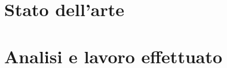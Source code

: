 \documentclass[twoside,openright,titlepage,fleqn,
	headinclude,11pt,a4paper,BCOR5mm,footinclude
	]{scrbook}
\begin{document}
\frenchspacing
\raggedbottom
{}
\pagestyle{plain}

\cleardoublepage
\cleardoublepage
\cleardoublepage\tableofcontents
\clearpage
\cleardoublepage
\newpage
{}
\pagestyle{scrheadings}
\sloppy
\part{Stato dell'arte}
%



\part{Analisi e lavoro effettuato}
%




\end{document}
